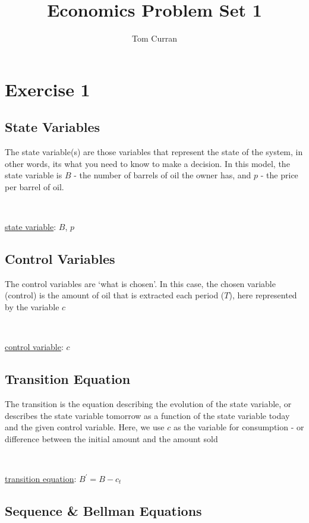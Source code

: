 \documentclass{article}
\title{Economics Problem Set 1}
\author{Tom Curran}
\begin{document}
\maketitle{}
\section{Exercise 1}

\subsection{State Variables}

The state variable(s) are those variables that represent the state of the system, in other words, its what you need to know to make a decision. In this model, the state variable is $B$ - the number of barrels of oil the owner has, and $p$ - the price per barrel of oil.

\

\underline{state variable}: $B$, $p$

\subsection{Control Variables}
The control variables are `what is chosen'. In this case, the chosen variable (control) is the amount of oil that is extracted each period ($T$), here represented by the variable $c$

\

\underline{control variable}: $c$

\subsection{Transition Equation}
The transition is the equation describing the evolution of the state variable, or describes the state variable tomorrow as a function of the state variable today and the given control variable. Here, we use $c$ as the variable for consumption - or difference between the initial amount and the amount sold

\

\underline{transition equation}: $B^\prime = B - c_t$

\subsection{Sequence \& Bellman Equations}
\end{document}
